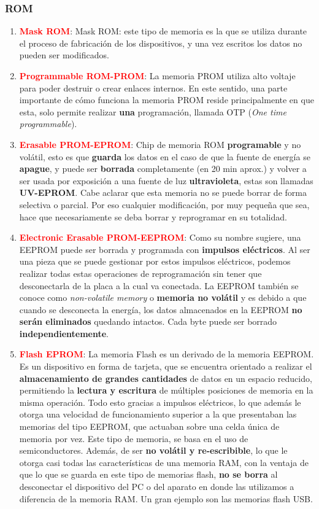 \documentclass[
	12pt, %
	fleqn, %
	a4paper, %
	oneside, %
]{LegrandOrangeBook}
\begin{document}
\subsubsection{ROM}
\begin{enumerate}
\item \textbf{\textcolor{red}{Mask ROM}}: Mask ROM: este tipo de memoria es la que se utiliza durante el proceso de fabricación de los dispositivos, y una vez escritos los datos no pueden ser modificados.
\item \textbf{\textcolor{red}{Programmable ROM-PROM}}: La memoria PROM utiliza alto voltaje para poder destruir o crear enlaces internos. En este sentido, una parte importante de cómo funciona la memoria PROM reside principalmente en que esta, solo permite realizar \textbf{una} programación, llamada OTP (\textit{One time programmable}).
\item \textbf{\textcolor{red}{Erasable PROM-EPROM}}: Chip de memoria ROM \textbf{programable} y no volátil, esto es que \textbf{guarda} los datos en el caso de que la fuente de energía se \textbf{apague}, y puede ser \textbf{borrada} completamente (en 20 min aprox.) y volver a ser usada por exposición a una fuente de luz \textbf{ultravioleta}, estas son llamadas \textbf{UV-EPROM}. Cabe aclarar que esta memoria no se puede borrar de forma selectiva o parcial. Por eso cualquier modificación, por muy pequeña que sea, hace que necesariamente se deba borrar y reprogramar en su totalidad.
\item \textbf{\textcolor{red}{Electronic Erasable PROM-EEPROM}}:  Como su nombre sugiere, una EEPROM puede ser borrada y programada con \textbf{impulsos eléctricos}. Al ser una pieza que se puede gestionar por estos impulsos eléctricos, podemos realizar todas estas operaciones de reprogramación sin tener que desconectarla de la placa a la cual va conectada. La EEPROM también se conoce como \textit{non-volatile memory} o \textbf{memoria no volátil} y es debido a que cuando se desconecta la energía, los datos almacenados en la EEPROM \textbf{no serán eliminados} quedando intactos. Cada byte puede ser borrado \textbf{independientemente}.
\item \textbf{\textcolor{red}{Flash EPROM}}: La memoria Flash es un derivado de la memoria EEPROM. Es un dispositivo en forma de tarjeta, que se encuentra orientado a realizar el \textbf{almacenamiento de grandes cantidades} de datos en un espacio reducido, permitiendo la \textbf{lectura y escritura} de múltiples posiciones de memoria en la misma operación. Todo esto gracias a impulsos eléctricos, lo que además le otorga una velocidad de funcionamiento superior a la que presentaban las memorias del tipo EEPROM, que actuaban sobre una celda única de memoria por vez. Este tipo de memoria, se basa en el uso de semiconductores. Además, de ser \textbf{no volátil y re-escribible}, lo que le otorga casi todas las características de una memoria RAM, con la ventaja de que lo que se guarda en este tipo de memorias flash, \textbf{no se borra} al desconectar el dispositivo del PC o del aparato en donde las utilizamos a diferencia de la memoria RAM. Un gran ejemplo son las memorias flash USB.
\end{enumerate}
\end{document}
